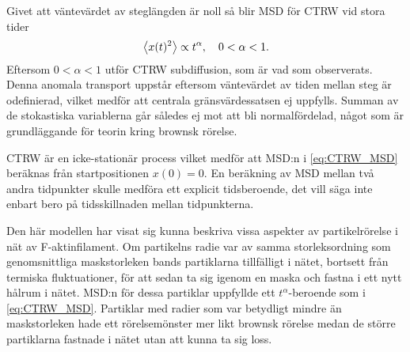 Givet att väntevärdet av steglängden är noll så blir MSD för CTRW vid stora tider
\begin{equation}\label{eq:CTRW_MSD}
    \ev{x(t)^2} \propto t^{\alpha} \qcomma 0<\alpha<1.
\end{equation}
Eftersom $0<\alpha<1$ utför CTRW subdiffusion, som är vad som observerats. Denna anomala transport uppstår eftersom väntevärdet av tiden mellan steg är odefinierad, vilket medför att centrala gränsvärdessatsen ej uppfylls. Summan av de stokastiska variablerna går således ej mot att bli normalfördelad, något som är grundläggande för teorin kring brownsk rörelse.

CTRW är en icke-stationär process \cite{Hofling&Franosch2013} vilket medför att MSD:n i \eqref{eq:CTRW_MSD} beräknas från startpositionen $x(0)=0$. En beräkning av MSD mellan två andra tidpunkter skulle medföra ett explicit tidsberoende, det vill säga inte enbart bero på tidsskillnaden mellan tidpunkterna.


\begin{comment}
Positionsändringen och väntetiden beskrivs av två oberoende stokastiska variabler. 
MSD för denna typ av rörelse blir\cite{Barkai_MSDCTRW2007}
\begin{equation}
    \ev{x^2(t)} \approx \frac{\ev{\Delta x^2}}{A \Gamma(1+\alpha)}t^{\alpha} + \frac{2\ev{\Delta x}^2}{\Gamma(1+2\alpha)A^2} t^{2\alpha}, 
\end{equation}
där $A$ är en konstant som dyker upp i fördelningsfunktionen för väntetiderna, $\Gamma$ är gammafunktionen, $\alpha$ en konstant som uppfyller $0<\alpha<1$ och $\Delta x$ steget mellan två positioner. Om $\ev{\Delta x}=0 $ försvinner andra termen och rörelsens MSD blir proportionell mot $t^\alpha$. Eftersom $\alpha < 1$ blir MSD:n inte linjär i tiden, utan ändringstakten kommer att avta med tiden och rörelsen skiljer sig från den klassiska brownska rörelsen.
\end{comment}

Den här modellen har visat sig kunna beskriva vissa aspekter av partikelrörelse i nät av F-aktinfilament\cite{Barkai_CTRW}. Om partikelns radie var av samma storleksordning som genomsnittliga maskstorleken bands partiklarna tillfälligt i nätet, bortsett från termiska fluktuationer, för att sedan ta sig igenom en maska och fastna i ett nytt hålrum i nätet. MSD:n för dessa partiklar uppfyllde ett $t^{\alpha}$-beroende som i \eqref{eq:CTRW_MSD}. Partiklar med radier som var betydligt mindre än maskstorleken hade ett rörelsemönster mer likt brownsk rörelse medan de större partiklarna fastnade i nätet utan att kunna ta sig loss.

